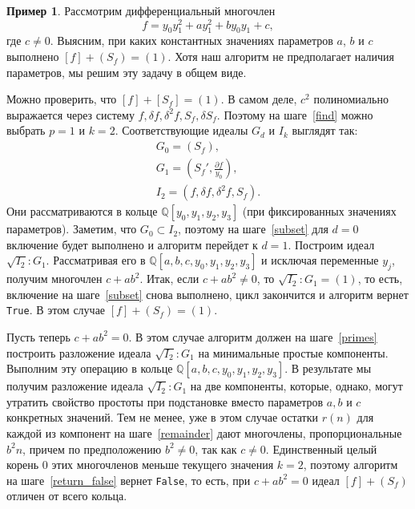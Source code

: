 \documentclass[11pt]{article}
\theoremstyle{plain1}
\theoremstyle{plain2}
\theoremstyle{plain}
\theoremstyle{plain3}
\theoremstyle{definition}
\newtheorem{example}[theorem3]{Пример}
\theoremstyle{remark}
\begin{document}
\label{examples}
\begin{example}\label{example:first}
Рассмотрим дифференциальный многочлен 
$$
f= y_0 y_1^2+ay_1^2+by_0 y_1+c,
$$
где $c \ne 0$.
Выясним, при каких константных значениях параметров $a$, $b$ и $c$ выполнено $[f]+(S_f)=(1)$.
Хотя наш алгоритм не предполагает наличия параметров, мы решим эту задачу в общем виде.

Можно проверить, что $[f] + [S_f] = (1)$.
В самом деле, $c^2$ полиномиально выражается через систему $f, \delta f, \delta^2 f, S_f, \delta {S_f}$.
Поэтому на шаге~\ref{find} можно выбрать $p = 1$ и $k=2$.
Соответствующие идеалы $G_d$ и $I_k$ выглядят так:
\begin{gather*}
G_0 = (S_f),\\
G_1 = \left({S_f}', \frac{\partial f}{y_0} \right),\\
I_2 = \left(f, \delta f, \delta^2 f, S_f\right).
\end{gather*}
Они рассматриваются в кольце $\mathbb{Q}[y_0, y_1, y_2, y_3]$ (при фиксированных значениях параметров).
Заметим, что $G_0 \subset I_2$, поэтому на шаге~\ref{subset} для $d=0$ включение будет выполнено и алгоритм перейдет к $d=1$.
Построим идеал $\sqrt{I_2}:G_1$.
Рассматривая его в $\mathbb{Q}[a,b,c,y_0,y_1, y_2, y_3]$ и исключая переменные $y_j$, получим многочлен $c + a b^2$.
Итак, если $c + ab^2 \ne 0$, то $\sqrt{I_2}:G_1 = (1)$, то есть, включение на шаге~\ref{subset} снова выполнено,
цикл закончится и алгоритм вернет \verb'True'. В этом случае $[f] + (S_f) = (1)$.

Пусть теперь $c + a b^2 = 0$.
В этом случае алгоритм должен на шаге~\ref{primes} построить разложение идеала $\sqrt{I_2}:G_1$
на минимальные простые компоненты. 
Выполним эту операцию в кольце $\mathbb{Q}[a,b,c,y_0,y_1,y_2,y_3]$.
В результате мы получим разложение идеала $\sqrt{I_2}:G_1$ на две компоненты,
которые, однако, могут утратить свойство простоты при подстановке вместо параметров $a, b$ и $c$ конкретных значений.
Тем не менее, уже в этом случае остатки $r(n)$ для каждой из компонент на шаге~\ref{remainder} дают многочлены,
пропорциональные $b^2 n$, причем по предположению $b^2 \ne 0$, так как $c \ne 0$.
Единственный целый корень $0$ этих многочленов меньше текущего значения $k = 2$,
поэтому алгоритм на шаге~\ref{return_false} вернет \verb'False', то есть,
при $c + a b^2 = 0$ идеал $[f] + (S_f)$ отличен от всего кольца.
\end{example}
\end{document}
